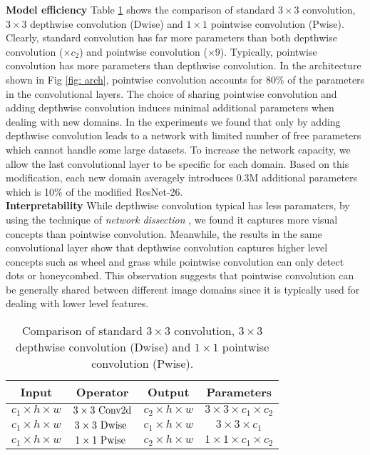 \documentclass[letterpaper]{article} \usepackage{aaai19}  \usepackage{times}  \usepackage{helvet}  \usepackage{courier}  \usepackage{url}  \usepackage{graphicx}  \usepackage{amssymb}
\begin{document}
\noindent\textbf{Model efficiency} Table \ref{table: comparison} shows the comparison of standard $3 \times 3$ convolution, $3 \times 3$ depthwise convolution (Dwise) and $1 \times 1$ pointwise convolution (Pwise). Clearly, standard convolution has far more parameters than both depthwise convolution ($\times c_2$) and pointwise convolution ($\times 9$). Typically, pointwise convolution has more parameters than depthwise convolution. In the architecture shown in Fig \ref{fig: arch}, pointwise convolution accounts for 80\% of the parameters in the convolutional layers. The choice of sharing pointwise convolution and adding depthwise convolution induces minimal additional parameters when dealing with new domains. In the experiments we found that only by adding depthwise convolution leads to a network with limited number of free parameters which cannot handle some large datasets. To increase the network capacity, we allow the last convolutional layer to be specific for each domain. Based on this modification, each new domain averagely introduces 0.3M additional parameters which is 10\% of the modified ResNet-26.
\\

\noindent\textbf{Interpretability} While depthwise convolution typical has less paramaters, by using the technique of \textit{network dissection} \cite{bau2017network}, we found it captures more visual concepts than pointwise convolution. Meanwhile, the results in the same convolutional layer show that depthwise convolution captures higher level concepts such as wheel and grass while pointwise convolution can only detect dots or honeycombed. This observation suggests that pointwise convolution can be generally shared between different image domains since it is typically used for dealing with lower level features.  

\begin{center}
\begin{table}
\small
\begin{tabular}{ |c|c|c|c| } 
 \hline
Input & Operator & Output  & Parameters \\ 
\hline
 $c_1 \times h \times w$ & $3 \times 3 \textnormal{ Conv2d}$ &  $c_2 \times h \times w$ &  $3 \times 3 \times c_1 \times c_2$ \\ 
 $c_1 \times h \times w$ & $3 \times 3 \textnormal{ Dwise }$ &  $c_1 \times h \times w$ & $3 \times 3 \times c_1$ \\
  $c_1 \times h \times w$ & $1 \times 1 \textnormal{ Pwise }$ & $c_2 \times h \times w$ & $1 \times 1 \times c_1 \times c_2$ \\ 
 \hline
\end{tabular}
\caption{Comparison of standard $3 \times 3$ convolution, $3 \times 3$ depthwise convolution (Dwise) and $1 \times 1$ pointwise convolution (Pwise).}
\label{table: comparison}
\end{table}
\end{center}
\end{document}
